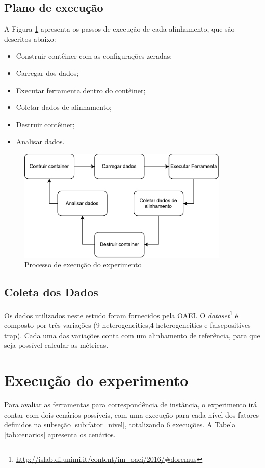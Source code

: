 \subsection{Plano de execução}
A Figura \ref{fig:experiment} apresenta os passos de execução de cada alinhamento, que são descritos abaixo:
\begin{itemize}
	\item Construir contêiner com as configurações zeradas;
	\item Carregar dos dados;
	\item Executar ferramenta dentro do contêiner;
	\item Coletar dados de alinhamento;
	\item Destruir contêiner;
	\item Analisar dados.
\end{itemize}

\begin{figure}[h]
	\centering
	\includegraphics[width=0.9\textwidth]{./imagens/experimento.pdf}
	\caption{Processo de execução do experimento}
	\label{fig:experiment}
\end{figure}

\subsection{Coleta dos Dados}
Os dados utilizados neste estudo foram fornecidos pela OAEI. O \textit{dataset}\footnote{\url{http://islab.di.unimi.it/content/im_oaei/2016/\#doremus}} é composto por três variações (9-heterogeneities,4-heterogeneities e falsepositives-trap). Cada uma das variações conta com um alinhamento de referência, para que seja possível calcular as métricas.

\section{Execução do experimento}
Para avaliar as ferramentas para correspondência de instância, o experimento irá contar com dois cenários possíveis, com uma execução para cada nível dos fatores definidos na subseção \ref{sub:fator_nivel}, totalizando 6 execuções. A Tabela \ref{tab:cenarios} apresenta os cenários. 

